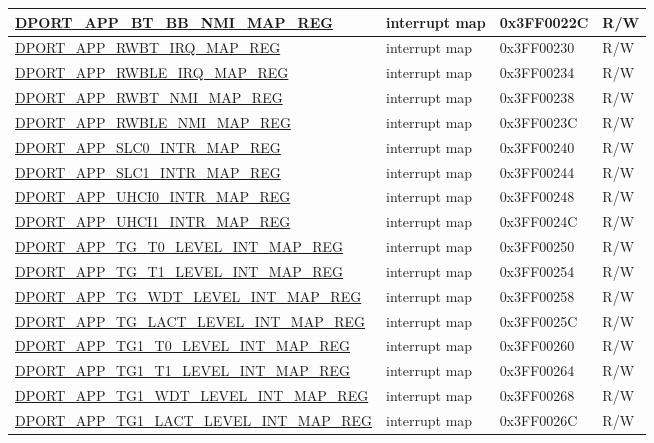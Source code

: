 \begin{longtable}{ |L{8.2cm} | L{4.5cm} | l | l | }
\hyperref[regdesc:APPBTBBNMIMAPREG]{DPORT\_APP\_BT\_BB\_NMI\_MAP\_REG} & interrupt map & 0x3FF0022C & R/W \\ \hline
\hyperref[regdesc:APPRWBTIRQMAPREG]{DPORT\_APP\_RWBT\_IRQ\_MAP\_REG} & interrupt map & 0x3FF00230 & R/W \\ \hline
\hyperref[regdesc:APPRWBLEIRQMAPREG]{DPORT\_APP\_RWBLE\_IRQ\_MAP\_REG} & interrupt map & 0x3FF00234 & R/W \\ \hline
\hyperref[regdesc:APPRWBTNMIMAPREG]{DPORT\_APP\_RWBT\_NMI\_MAP\_REG} & interrupt map & 0x3FF00238 & R/W \\ \hline
\hyperref[regdesc:APPRWBLENMIMAPREG]{DPORT\_APP\_RWBLE\_NMI\_MAP\_REG} & interrupt map & 0x3FF0023C & R/W \\ \hline
\hyperref[regdesc:APPSLC0INTRMAPREG]{DPORT\_APP\_SLC0\_INTR\_MAP\_REG} & interrupt map & 0x3FF00240 & R/W \\ \hline
\hyperref[regdesc:APPSLC1INTRMAPREG]{DPORT\_APP\_SLC1\_INTR\_MAP\_REG} & interrupt map & 0x3FF00244 & R/W \\ \hline
\hyperref[regdesc:APPUHCI0INTRMAPREG]{DPORT\_APP\_UHCI0\_INTR\_MAP\_REG} & interrupt map & 0x3FF00248 & R/W \\ \hline
\hyperref[regdesc:APPUHCI1INTRMAPREG]{DPORT\_APP\_UHCI1\_INTR\_MAP\_REG} & interrupt map & 0x3FF0024C & R/W \\ \hline
\hyperref[regdesc:APPTGT0LEVELINTMAPREG]{DPORT\_APP\_TG\_T0\_LEVEL\_INT\_MAP\_REG} & interrupt map & 0x3FF00250 & R/W \\ \hline
\hyperref[regdesc:APPTGT1LEVELINTMAPREG]{DPORT\_APP\_TG\_T1\_LEVEL\_INT\_MAP\_REG} & interrupt map & 0x3FF00254 & R/W \\ \hline
\hyperref[regdesc:APPTGWDTLEVELINTMAPREG]{DPORT\_APP\_TG\_WDT\_LEVEL\_INT\_MAP\_REG} & interrupt map & 0x3FF00258 & R/W \\ \hline
\hyperref[regdesc:APPTGLACTLEVELINTMAPREG]{DPORT\_APP\_TG\_LACT\_LEVEL\_INT\_MAP\_REG} & interrupt map & 0x3FF0025C & R/W \\ \hline
\hyperref[regdesc:APPTG1T0LEVELINTMAPREG]{DPORT\_APP\_TG1\_T0\_LEVEL\_INT\_MAP\_REG} & interrupt map & 0x3FF00260 & R/W \\ \hline
\hyperref[regdesc:APPTG1T1LEVELINTMAPREG]{DPORT\_APP\_TG1\_T1\_LEVEL\_INT\_MAP\_REG} & interrupt map & 0x3FF00264 & R/W \\ \hline
\hyperref[regdesc:APPTG1WDTLEVELINTMAPREG]{DPORT\_APP\_TG1\_WDT\_LEVEL\_INT\_MAP\_REG} & interrupt map & 0x3FF00268 & R/W \\ \hline
\hyperref[regdesc:APPTG1LACTLEVELINTMAPREG]{DPORT\_APP\_TG1\_LACT\_LEVEL\_INT\_MAP\_REG} & interrupt map & 0x3FF0026C & R/W \\ \hline

\end{longtable}
